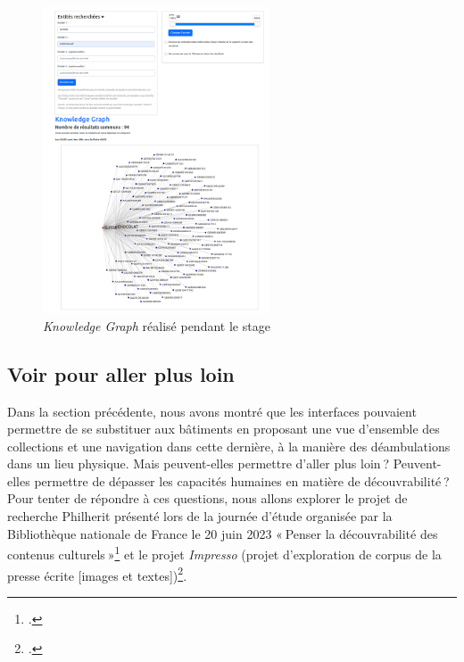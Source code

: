 \begin{figure}[h!]
	\centering
	\includegraphics[width=0.6\textwidth]{images/imageknowledge.png}
	\caption{\textit{Knowledge Graph} réalisé pendant le stage}
	\label{fig:imageknowledge}
\end{figure}


\subsection{Voir pour aller plus loin}

Dans la section précédente, nous avons montré que les interfaces pouvaient permettre de se substituer aux bâtiments en proposant une vue d’ensemble des collections et une navigation dans cette dernière, à la manière des déambulations dans un lieu physique. Mais peuvent-elles permettre d’aller plus loin ? Peuvent-elles permettre de dépasser les capacités humaines en matière de découvrabilité ? Pour tenter de répondre à ces questions, nous allons explorer le projet de recherche Philherit présenté lors de la journée d’étude organisée par la Bibliothèque nationale de France le 20 juin 2023 « Penser la découvrabilité des contenus culturels »\footcite{plouviez_philosophie_2023} et le projet \textit{Impresso} (projet d’exploration de corpus de la presse écrite [images et textes])\footcite{noauthor_impresso_nodate}.

